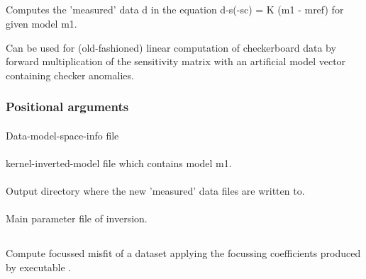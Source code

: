 \subsection{} \label{programs_scripts,sec:bin_prog,sec:comp_data_kernel_sys}
Computes the 'measured' data d in the equation  d-s(-sc) = K (m1 - mref)  for given model m1.

Can be used for (old-fashioned) linear computation of checkerboard data by forward multiplication of the sensitivity 
matrix with an artificial model vector containing checker anomalies.
\subsubsection{Positional arguments}
\paragraph{}
Data-model-space-info file
\paragraph{}
kernel-inverted-model file which contains model m1.            
\paragraph{}
Output directory where the new 'measured' data files are written to.
\paragraph{}
Main parameter file of inversion. 
%
%
\subsection{} \label{programs_scripts,sec:bin_prog,sec:comp_focus_misfit}
Compute focussed misfit of a dataset applying the focussing coefficients produced by executable 
.

